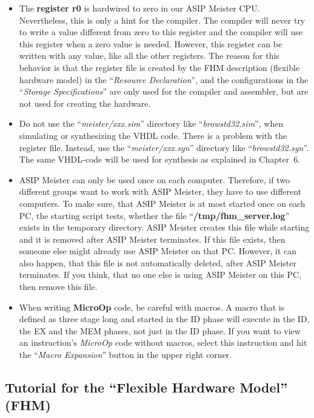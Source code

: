 \documentclass[
]{article}
\begin{document}
\begin{itemize}
\item
  The \textbf{register r0} is hardwired to zero in our ASIP Meister CPU.
  Nevertheless, this is only a hint for the compiler. The compiler will
  never try to write a value different from zero to this register and
  the compiler will use this register when a zero value is needed.
  However, this register can be written with any value, like all the
  other registers. The reason for this behavior is that the register
  file is created by the FHM description (flexible hardware model) in
  the ``\emph{Resource Declaration}'', and the configurations in the
  ``\emph{Storage Specifications}'' are only used for the compiler and
  assembler, but are not used for creating the hardware.
\item
  Do not use the ``\emph{meister/xxx.sim}'' directory like
  ``\emph{browstd32.sim}'', when simulating or synthesizing the VHDL
  code. There is a problem with the register file. Instead, use the
  ``\emph{meister/xxx.syn}'' directory like ``\emph{browstd32.syn}''.
  The same VHDL-code will be used for synthesis as explained in
  Chapter~6.
\item
  ASIP Meister can only be used once on each computer. Therefore, if two
  different groups want to work with ASIP Meister, they have to use
  different computers. To make sure, that ASIP Meister is at most
  started once on each PC, the starting script tests, whether the file
  ``\textbf{/tmp/fhm\_server.log}'' exists in the temporary directory.
  ASIP Meister creates this file while starting and it is removed after
  ASIP Meister terminates. If this file exists, then someone else might
  already use ASIP Meister on that PC. However, it can also happen, that
  this file is not automatically deleted, after ASIP Meister terminates.
  If you think, that no one else is using ASIP Meister on this PC, then
  remove this file.
\item
  When writing \textbf{MicroOp} code, be careful with macros. A macro
  that is defined as three stage long and started in the ID phase will
  execute in the ID, the EX and the MEM phases, not just in the ID
  phase. If you want to view an instruction's \emph{MicroOp} code
  without macros, select this instruction and hit the ``\emph{Macro
  Expansion}'' button in the upper right corner.
\end{itemize}

\hypertarget{tutorial-for-the-flexible-hardware-model-fhm}{%
\subsection{Tutorial for the ``Flexible Hardware Model''
(FHM)}\label{tutorial-for-the-flexible-hardware-model-fhm}}
\end{document}
